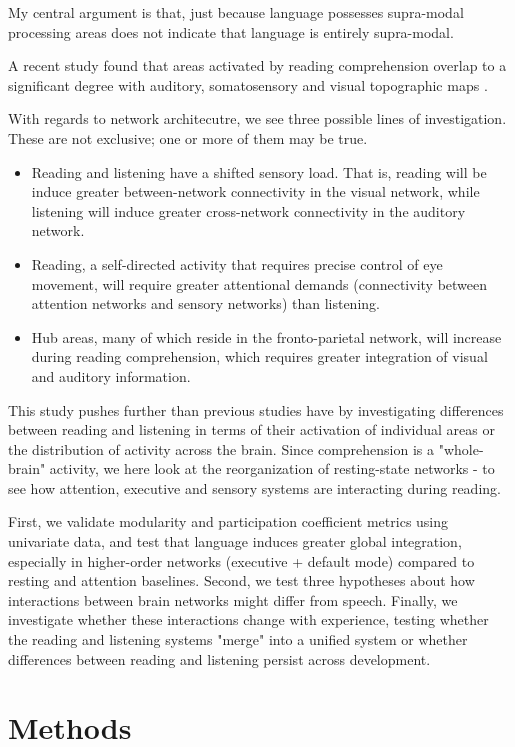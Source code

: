 My central argument is that, just because language possesses supra-modal processing areas does not indicate that language is entirely supra-modal. 

A recent study found that areas activated by reading comprehension overlap to a significant degree with auditory, somatosensory and visual topographic maps \cite{Sood2016}. 

With regards to network architecutre, we see three possible lines of investigation. These are not exclusive; one or more of them may be true.

\begin{itemize}
	\item Reading and listening have a shifted sensory load. That is, reading will be induce greater between-network connectivity in the visual network, while listening will induce greater cross-network connectivity in the auditory network.  
	\item Reading, a self-directed activity that requires precise control of eye movement, will require greater attentional demands (connectivity between attention networks and sensory networks) than listening. 
	\item Hub areas, many of which reside in the fronto-parietal network, will increase during reading comprehension, which requires greater integration of visual and auditory information.
\end{itemize}

This study pushes further than previous studies have by investigating differences between reading and listening in terms of their activation of individual areas or the distribution of activity across the brain. Since comprehension is a "whole-brain" activity, we here look at the reorganization of resting-state networks - to see how attention, executive and sensory systems are interacting during reading.

First, we validate modularity and participation coefficient metrics using univariate data, and test that language induces greater global integration, especially in higher-order networks (executive + default mode) compared to resting and attention baselines. Second, we test three hypotheses about how interactions between brain networks might differ from speech. Finally, we investigate whether these interactions change with experience, testing whether the reading and listening systems "merge" into a unified system or whether differences between reading and listening persist across development.


\section{Methods}

